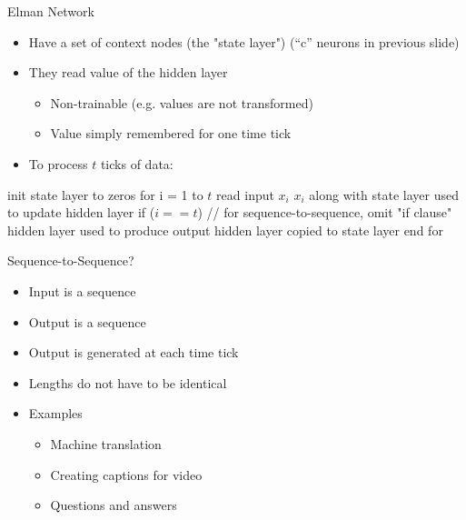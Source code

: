 \documentclass[aspectratio=169]{beamer}
\begin{document}
\begin{frame}[fragile]{Elman Network}

\begin{itemize}
	\item Have a set of context nodes (the "state layer") (``c'' neurons in previous slide)
	\item They read value of the hidden layer
	\begin{itemize}
		\item Non-trainable (e.g. values are not transformed)
		\item Value simply remembered for one time tick 
	\end{itemize}
	\item To process $t$ ticks  of data:
\end{itemize}

\begin{SQL}
init state layer to zeros
for i = 1 to $t$
  read input $x_i$
  $x_i$ along with state layer used to update hidden layer
  if ($i == t$) // for sequence-to-sequence, omit "if clause"
    hidden layer used to produce output
  hidden layer copied to state layer
end for 
\end{SQL}
\end{frame}
\begin{frame}{Sequence-to-Sequence?}

\begin{itemize}
	\item Input is a sequence
	\item Output is a sequence
	\item Output is generated at each time tick
	\item Lengths do not have to be identical
	\item Examples
	\begin{itemize}
		\item Machine translation
		\item Creating captions for video 
		\item Questions and answers
	\end{itemize}
\end{itemize}
\end{frame}
\end{document}
